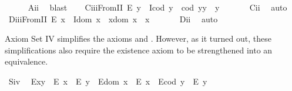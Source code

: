 \begin{isabellebody}
%
\isadelimproof
\ \ \ \ %
\endisadelimproof
%
\isatagproof
{}\isamarkupfalse%
\ A\isactrlsub i\isactrlsub i\ \isamarkupfalse%
\ blast%
\endisatagproof
{\isafoldproof}%
%
\isadelimproof
\isanewline
%
\endisadelimproof
\ \ \isamarkupfalse%
\ C\isactrlsub i\isactrlsub i\isactrlsub iFromII{\isacharcolon}\ {\isachardoublequoteopen}E\ y\ \isactrlbold {\isasymrightarrow}\ {\isacharparenleft}I{\isacharparenleft}cod\ y{\isacharparenright}\ \isactrlbold {\isasymand}\ {\isacharparenleft}cod\ y{\isacharparenright}{\isasymcdot}y\ {\isasymcong}\ y{\isacharparenright}{\isachardoublequoteclose}\ \isanewline
%
\isadelimproof
\ \ \ \ %
\endisadelimproof
%
\isatagproof
{}\isamarkupfalse%
\ C\isactrlsub i\isactrlsub i\ \isamarkupfalse%
\ auto%
\endisatagproof
{\isafoldproof}%
%
\isadelimproof
\isanewline
%
\endisadelimproof
\ \ \isamarkupfalse%
\ D\isactrlsub i\isactrlsub i\isactrlsub iFromII{\isacharcolon}\ {\isachardoublequoteopen}E\ x\ \isactrlbold {\isasymrightarrow}\ {\isacharparenleft}I{\isacharparenleft}dom\ x{\isacharparenright}\ \isactrlbold {\isasymand}\ x{\isasymcdot}{\isacharparenleft}dom\ x{\isacharparenright}\ {\isasymcong}\ x{\isacharparenright}{\isachardoublequoteclose}\ \isanewline
%
\isadelimproof
\ \ \ \ %
\endisadelimproof
%
\isatagproof
{}\isamarkupfalse%
\ D\isactrlsub i\isactrlsub i\ \isamarkupfalse%
\ auto%
\endisatagproof
{\isafoldproof}%
%
\isadelimproof
%
\endisadelimproof
%
\isamarkuptrue%
%
\begin{isamarkuptext}%
Axiom Set IV simplifies the axioms  and  . However, as it turned 
 out, these simplifications also require the existence axiom  to be strengthened into
 an equivalence.%
\end{isamarkuptext}\isamarkuptrue%
\ S\isactrlsub i\isactrlsub v{\isacharcolon}\ %
\ {\isachardoublequoteopen}{\isacharparenleft}E{\isacharparenleft}x{\isasymcdot}y{\isacharparenright}\ \isactrlbold {\isasymrightarrow}\ {\isacharparenleft}E\ x\ \isactrlbold {\isasymand}\ E\ y{\isacharparenright}{\isacharparenright}\ \isactrlbold {\isasymand}\ {\isacharparenleft}E{\isacharparenleft}dom\ x{\isacharparenright}\ \isactrlbold {\isasymrightarrow}\ E\ x{\isacharparenright}\ \isactrlbold {\isasymand}\ {\isacharparenleft}E{\isacharparenleft}cod\ y{\isacharparenright}\ \isactrlbold {\isasymrightarrow}\ E\ y{\isacharparenright}{\isachardoublequoteclose}\ \ \isanewline

\end{isabellebody}
